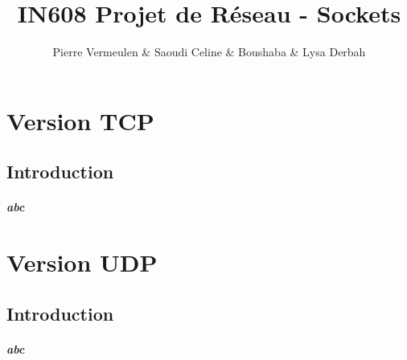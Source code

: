 \documentclass[10pt, a4paper]{report}
\title{\huge \textbf{IN608 Projet de Réseau - Sockets}}
\date{}
\author{Pierre Vermeulen \& Saoudi Celine \& Boushaba \& Lysa Derbah}
\begin{document}
	\begin{titlingpage}
		\maketitle
	\end{titlingpage}
	
	\renewcommand\contentsname{Sommaire}
	
	\tableofcontents
	\newpage
	
	\chapter{Version TCP}
	
	\section{Introduction}
	\paragraph{
		abc
	}
	
	\chapter{Version UDP}
	\section{Introduction}
	\paragraph{
		abc
	}
\end{document}
